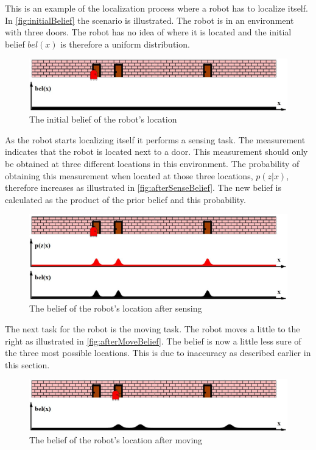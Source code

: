 This is an example of the localization process where a robot has to localize itself. In \autoref{fig:initialBelief} the scenario is illustrated. The robot is in an environment with three doors. The robot has no idea of where it is located and the initial belief $bel(x)$ is therefore a uniform distribution.

\begin{figure}[H]
\centering
\includegraphics[scale=0.36]{images/MarkovLocalizationA}
\caption{The initial belief of the robot's location}
\label{fig:initialBelief}
\end{figure}

As the robot starts localizing itself it performs a sensing task. The measurement indicates that the robot is located next to a door. This measurement should only be obtained at three different locations in this environment. The probability of obtaining this measurement when located at those three locations, $p(z|x)$, therefore increases as illustrated in \autoref{fig:afterSenseBelief}. The new belief is calculated as the product of the prior belief and this probability.

\begin{figure}[H]
\centering
\includegraphics[scale=0.36]{images/MarkovLocalizationB}
\caption{The belief of the robot's location after sensing}
\label{fig:afterSenseBelief}
\end{figure}

The next task for the robot is the moving task. The robot moves a little to the right as illustrated in \autoref{fig:afterMoveBelief}. The belief is now a little less sure of the three most possible locations. This is due to inaccuracy as described earlier in this section.

\begin{figure}[H]
\centering
\includegraphics[scale=0.36]{images/MarkovLocalizationC}
\caption{The belief of the robot's location after moving}
\label{fig:afterMoveBelief}
\end{figure}

